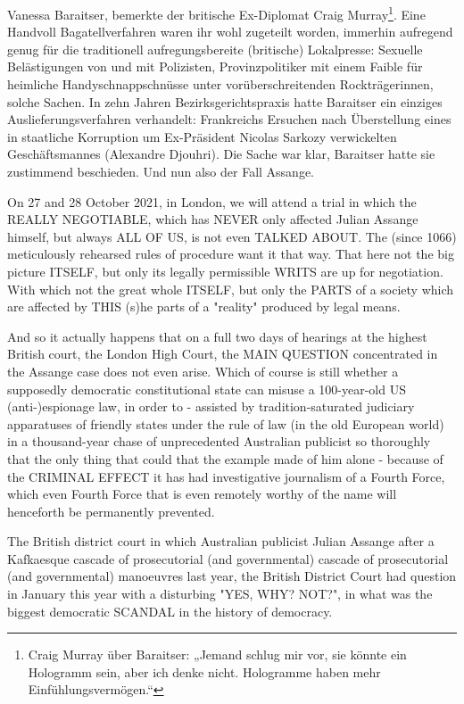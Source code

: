 \begin{multicols}{2}
{Vanessa Baraitser, bemerkte der britische Ex-Diplomat
Craig Murray\footnote[1]{Craig Murray über Baraitser: „Jemand schlug mir vor, sie könnte ein Hologramm sein, aber ich denke nicht. Hologramme haben mehr Einfühlungsvermögen.“}.
\textCR
Eine Handvoll Bagatellverfahren waren ihr wohl zugeteilt worden, immerhin aufregend genug für die traditionell aufregungsbereite (britische) Lokalpresse: Sexuelle
Belästigungen von und mit Polizisten, Provinzpolitiker
mit einem Faible für heimliche Handyschnappschnüsse unter vorüberschreitenden Rockträgerinnen, solche
Sachen. In zehn Jahren Bezirksgerichtspraxis hatte Baraitser ein einziges Auslieferungsverfahren verhandelt:
\textCR
Frankreichs Ersuchen nach Überstellung eines in staatliche Korruption um Ex-Präsident Nicolas Sarkozy verwickelten Geschäftsmannes (Alexandre Djouhri). Die
Sache war klar, Baraitser hatte sie zustimmend beschieden.
\textCR
Und nun also der Fall Assange.}

On 27 and 28 October 2021, in London, we will attend
a trial in which the REALLY NEGOTIABLE, which has NEVER only affected Julian Assange himself, but always ALL OF US, is not even TALKED ABOUT. The (since 1066) meticulously rehearsed rules of procedure want it that way. That here
not the big picture ITSELF, but only its legally permissible WRITS are up for negotiation. With which not the great whole ITSELF,
but only the PARTS of a society which are affected by THIS
(s)he parts of a "reality" produced by legal means.

And so it actually happens that on a full two days of hearings at the highest British court, the
London High Court, the MAIN QUESTION concentrated in the Assange case does not even arise. Which of course
is still whether a supposedly democratic constitutional state can misuse a 100-year-old US (anti-)espionage law,
in order to - assisted by tradition-saturated judiciary apparatuses
of friendly states under the rule of law (in the old European world) in a thousand-year chase of unprecedented
Australian publicist so thoroughly that the only thing that could
that the example made of him alone - because of the CRIMINAL EFFECT it has had
investigative journalism of a Fourth Force, which even
Fourth Force that is even remotely worthy of the name will henceforth be permanently prevented.

The British district court in which Australian publicist
Julian Assange after a Kafkaesque cascade of prosecutorial (and governmental)
cascade of prosecutorial (and governmental) manoeuvres last year, the British District Court had
question in January this year with a disturbing "YES, WHY?
NOT?", in what was the biggest democratic
SCANDAL in the history of democracy.


\end{multicols}
